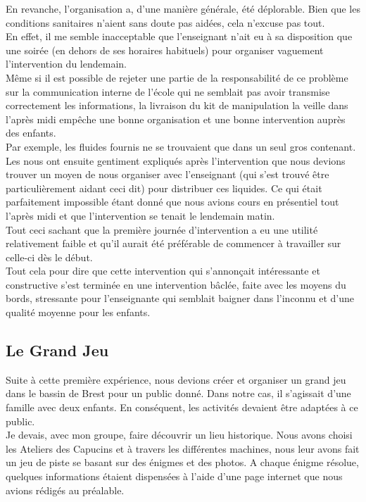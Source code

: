{En revanche, l'organisation a, d'une manière générale, été déplorable. Bien que les conditions sanitaires n'aient sans doute pas aidées, cela n'excuse pas tout.\\
En effet, il me semble inacceptable que l'enseignant n'ait eu à sa disposition que une soirée (en dehors de ses horaires habituels) pour organiser vaguement l'intervention du lendemain.\\
Même si il est possible de rejeter une partie de la responsabilité de ce problème sur la communication interne de l'école qui ne semblait pas avoir transmise correctement les informations, la livraison du kit de manipulation la veille dans l'après midi empêche une bonne organisation et une bonne intervention auprès des enfants.\\
Par exemple, les fluides fournis ne se trouvaient que dans un seul gros contenant.\\ Les \pd nous ont ensuite gentiment expliqués après l'intervention que nous devions trouver un moyen de nous organiser avec l'enseignant (qui s'est trouvé être particulièrement aidant ceci dit) pour distribuer ces liquides. Ce qui était parfaitement impossible étant donné que nous avions cours en présentiel tout l'après midi et que l'intervention se tenait le lendemain matin.\\
Tout ceci sachant que la première journée d'intervention a eu une utilité relativement faible et qu'il aurait été préférable de commencer à travailler sur celle-ci dès le début.\\

Tout cela pour dire que cette intervention qui s'annonçait intéressante et constructive s'est terminée en une intervention bâclée, faite avec les moyens du bords, stressante pour l'enseignante qui semblait baigner dans l'inconnu et d'une qualité moyenne pour les enfants.

\subsection{Le Grand Jeu}

Suite à cette première expérience, nous devions créer et organiser un grand jeu dans le bassin de Brest pour un public donné. Dans notre cas, il s'agissait d'une famille avec deux enfants. En conséquent, les activités devaient être adaptées à ce public.\\

Je devais, avec mon groupe, faire découvrir un lieu historique. Nous avons choisi les Ateliers des Capucins et à travers les différentes machines, nous leur avons fait un jeu de piste se basant sur des énigmes et des photos. A chaque énigme résolue, quelques informations étaient dispensées à l'aide d'une page internet que nous avions rédigés au préalable.\\

}
